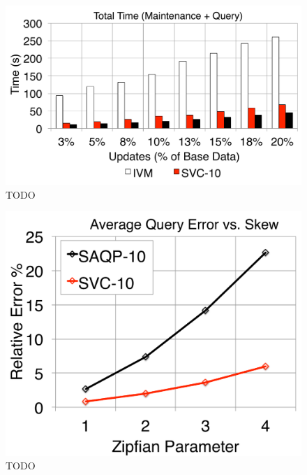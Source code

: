 \begin{figure}[t]
\centering
 \includegraphics[scale=0.16]{exp/msj_4.pdf}
  \caption{TODO \label{exp-1-total}}
\end{figure}

\begin{figure}[t]
\centering
  \includegraphics[scale=0.15]{exp/msj_5.pdf}
 \caption{TODO \label{exp-1-zipf}}
\end{figure}

